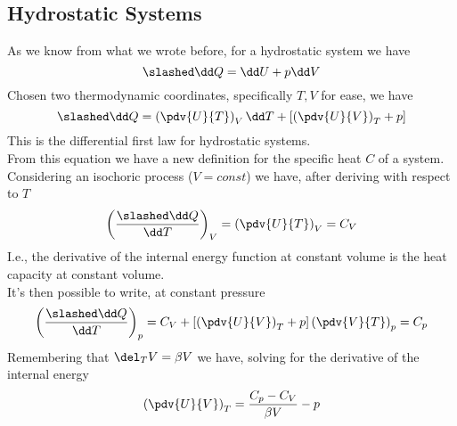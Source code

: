 \documentclass[../qm.tex]{subfiles}
\begin{document}
\subsection{Hydrostatic Systems}
As we know from what we wrote before, for a hydrostatic system we have
\begin{equation}
	\slashed\dd Q=\dd U+p\dd V
	\label{eq:1sthydro.ig}
\end{equation}
Chosen two thermodynamic coordinates, specifically $T, V$ for ease, we have
\begin{equation}
	\slashed\dd Q=\left( \pdv{U}{T} \right)_V\dd T+\left[ \left( \pdv{U}{V}\right)_T+p \right]
	\label{eq:1stlawhydro.ig}
\end{equation}
This is the differential first law for hydrostatic systems.\\
From this equation we have a new definition for the specific heat $C$ of a system.\\
Considering an isochoric process ($V=const$) we have, after deriving with respect to $T$
\begin{equation}
	\left( \frac{\slashed\dd Q}{\dd T} \right)_V=\left( \pdv{U}{T} \right)_V=C_V
	\label{eq:heatcapv.ig}
\end{equation}
I.e., the derivative of the internal energy function at constant volume is the heat capacity at constant volume.\\
It's then possible to write, at constant pressure
\begin{equation}
	\left( \frac{\slashed\dd Q}{\dd T} \right)_p=C_V+\left[ \left( \pdv{U}{V} \right)_T+p \right]\left( \pdv{V}{T} \right)_p=C_p
	\label{eq:cphydro.ig}
\end{equation}
Remembering that $\del_T V=\beta V$ we have, solving for the derivative of the internal energy
\begin{equation}
	\left( \pdv{U}{V} \right)_T=\frac{C_p-C_V}{\beta V}-p
	\label{eq:heatcapp.ig}
\end{equation}
\end{document}

